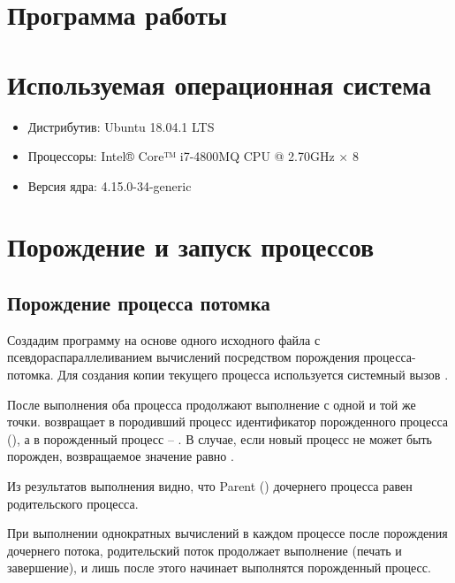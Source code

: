 





\tableofcontents
\newpage

\section{Программа работы}



\section{Используемая операционная система}

\begin{itemize}
	\item Дистрибутив: Ubuntu 18.04.1 LTS
	\item Процессоры: Intel® Core™ i7-4800MQ CPU @ 2.70GHz × 8
	\item Версия ядра: 4.15.0-34-generic
\end{itemize}

\section{Порождение и запуск процессов}

\subsection{Порождение процесса потомка}

Создадим программу на основе одного исходного файла с псевдораспараллеливанием вычислений посредством порождения процесса-потомка. Для создания копии текущего процесса используется системный вызов .


После выполнения  оба процесса продолжают выполнение с одной и той же точки.  возвращает в породивший процесс идентификатор порожденного
процесса (), а в порожденный процесс -- . В случае, если новый процесс не может быть порожден, возвращаемое значение равно .



Из результатов выполнения видно, что Parent  () дочернего процесса равен  родительского процесса.

При выполнении однократных вычислений в каждом процессе после порождения дочернего потока, родительский поток продолжает выполнение (печать и завершение), и лишь после этого начинает выполнятся порожденный процесс.

